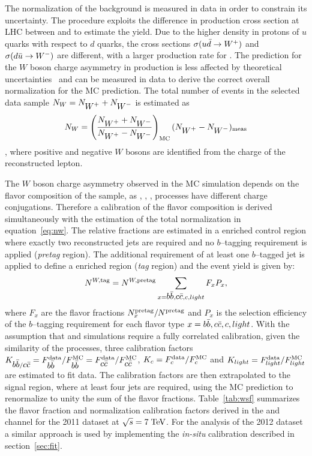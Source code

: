 The normalization of the \wjets{} background is measured in data in
order to constrain its uncertainty.
The procedure exploits the difference in production cross section at LHC
between \wpp{} and \wm{} to estimate the \wjets{} yield.
Due to the higher density in protons of $u$ quarks with respect to $d$ quarks,
the cross sections $\sigma(u\bar{d}\to \mbox{$W^+$}{})$ and $\sigma(d\bar{u}\to
\mbox{$W^-$}{})$ are different, with a larger production rate for \wpp{}. The
prediction for the $W$ boson charge asymmetry in \wjets{} production is less
affected by theoretical uncertainties~\cite{wasym} and can be measured
in data to derive the correct overall normalization for the MC prediction.
The total number of \wjets{} events in the selected data sample
$N_W=N_{\mbox{$W^+$}{}}+N_{\mbox{$W^-$}{}}$ is estimated as
\begin{equation}
N_W = \left(\frac{N_{\mbox{$W^+$}{}}+N_{\mbox{$W^-$}{}}}{N_{\mbox{$W^+$}{}}-N_{\mbox{$W^-$}{}}}\right )_{\rm MC}(N_{\mbox{$W^+$}{}}-N_{\mbox{$W^-$}{}})_{\rm meas}
\label{eq:nw}
\end{equation}
, where positive and negative $W$ bosons are identified from the
charge of the reconstructed lepton. 

The $W$ boson charge asymmetry observed in the MC simulation depends
on the flavor composition of the sample, as \wbb{}, \wcc{}, \wc{}, \wlight{}
processes have different charge conjugations.
Therefore a calibration of the flavor composition is derived
simultaneously with the estimation of the total normalization in
equation~\ref{eq:nw}.
The relative fractions are estimated in a \wjets{} enriched control
region where exactly two reconstructed jets are required and no
$b$--tagging requirement is applied ({\it pretag} region). 
The additional requirement of at least one $b$--tagged jet is applied
to define a \wbb{} enriched region ({\it tag} region) and the \wjets{}
event yield is given by: 
\begin{equation}
\label{eq:nwt}
N^{W,{\rm tag}} = 
N^{W,{\rm pretag}}
\sum_{x=\mbox{$b\bar{b}$}{}, \mbox{$c\bar{c}$}{}, c, light} F_xP_x,
\end{equation}
where $F_x$ are the flavor fractions $N^{\rm pretag}_x/N^{\rm pretag}$
and $P_x$ is the selection efficiency of the $b$--tagging requirement for each
flavor type $x = \mbox{$b\bar{b}$}{}, \mbox{$c\bar{c}$}{}, c, light$. 
 With the assumption that \wbb{} and \wcc{} simulations require a
 fully correlated calibration, given the similarity of the processes,
 three calibration factors $K_{\mbox{$b\bar{b}$}{}/\mbox{$c\bar{c}$}{}}=F^{\rm
   data}_{\mbox{$b\bar{b}$}{}}/F^{\rm MC}_{\mbox{$b\bar{b}$}{}}=F^{\rm
   data}_{\mbox{$c\bar{c}$}{}}/F^{\rm MC}_{\mbox{$c\bar{c}$}{}}$, $K_c=F^{\rm data}_{c}/F^{\rm MC}_{c}$ and $K_{light}=F^{\rm
  data}_{light}/F^{\rm MC}_{light}$ are estimated to fit data. The
calibration factors are then extrapolated to the signal region, where
at least four jets are required, using the MC prediction
to renormalize to unity the sum of the flavor fractions.
Table~\ref{tab:wsf} summarizes the flavor fraction and normalization
calibration factors derived in the \ejets{} and \mujets{} channel for
the 2011 dataset at $\sqrt{s} = 7 \; \mathrm{TeV}{}$.
For the analysis of the 2012 dataset a similar approach is used by
implementing the {\it in-situ} calibration described in section~\ref{sec:fit}.

